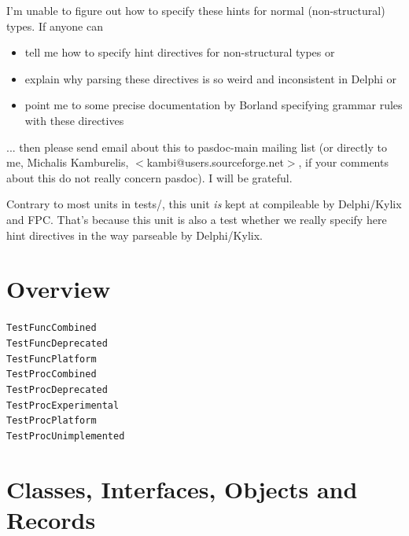 \documentclass{report}
\newif\ifpdf
\begin{document}
I'm unable to figure out how to specify these hints for normal (non{-}structural) types. If anyone can \begin{itemize}
\item tell me how to specify hint directives for non{-}structural types or
\item explain why parsing these directives is so weird and inconsistent in Delphi or
\item point me to some precise documentation by Borland specifying grammar rules with these directives
\end{itemize} ... then please send email about this to pasdoc{-}main mailing list (or directly to me, Michalis Kamburelis, {$<$}kambi@users.sourceforge.net{$>$}, if your comments about this do not really concern pasdoc). I will be grateful.

Contrary to most units in tests/, this unit \textit{is} kept at compileable by Delphi/Kylix and FPC. That's because this unit is also a test whether we really specify here hint directives in the way parseable by Delphi/Kylix.
\section{Overview}
\begin{description}
\item[\texttt{\begin{ttfamily}TTestClassDeprecated\end{ttfamily} Class}]
\item[\texttt{\begin{ttfamily}TTestRecordDeprecated\end{ttfamily} Record}]
\end{description}
\begin{description}
\item[\texttt{TestFuncCombined}]
\item[\texttt{TestFuncDeprecated}]
\item[\texttt{TestFuncPlatform}]
\item[\texttt{TestProcCombined}]
\item[\texttt{TestProcDeprecated}]
\item[\texttt{TestProcExperimental}]
\item[\texttt{TestProcPlatform}]
\item[\texttt{TestProcUnimplemented}]
\end{description}
\section{Classes, Interfaces, Objects and Records}
\ifpdf
\end{document}
